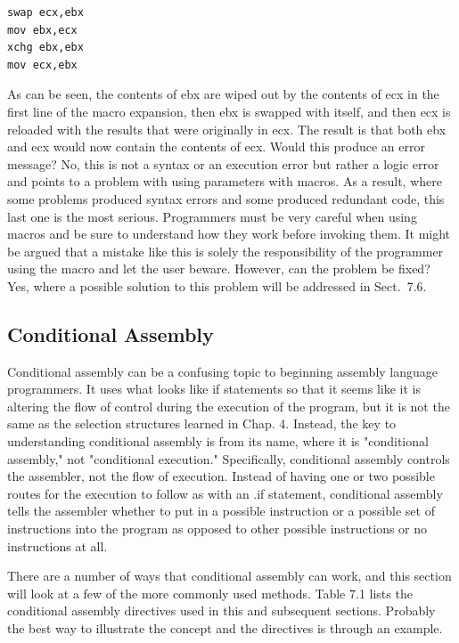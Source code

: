 \documentclass[10pt]{book}
\begin{document}
\begin{verbatim}
swap ecx,ebx
mov ebx,ecx
xchg ebx,ebx
mov ecx,ebx
\end{verbatim}

As can be seen, the contents of ebx are wiped out by the contents of ecx in the first line of the macro expansion, then ebx is swapped with itself, and then ecx is reloaded with the results that were originally in ecx. The result is that both ebx and ecx would now contain the contents of ecx. Would this produce an error message? No, this is not a syntax or an execution error but rather a logic error and points to a problem with using parameters with macros. As a result, where some problems produced syntax errors and some produced redundant code, this last one is the most serious. Programmers must be very careful when using macros and be sure to understand how they work before invoking them. It might be argued that a mistake like this is solely the responsibility of the programmer using the macro and let the user beware. However, can the problem be fixed? Yes, where a possible solution to this problem will be addressed in Sect.\ 7.6.
\subsection{Conditional Assembly}
Conditional assembly can be a confusing topic to beginning assembly language programmers. It uses what looks like if statements so that it seems like it is altering the flow of control during the execution of the program, but it is not the same as the selection structures learned in Chap. 4. Instead, the key to understanding conditional assembly is from its name, where it is "conditional assembly," not "conditional execution." Specifically, conditional assembly controls the assembler, not the flow of execution. Instead of having one or two possible routes for the execution to follow as with an .if statement, conditional assembly tells the assembler whether to put in a possible instruction or a possible set of instructions into the program as opposed to other possible instructions or no instructions at all.

There are a number of ways that conditional assembly can work, and this section will look at a few of the more commonly used methods. Table 7.1 lists the conditional assembly directives used in this and subsequent sections. Probably the best way to illustrate the concept and the directives is through an example.
\end{document}
